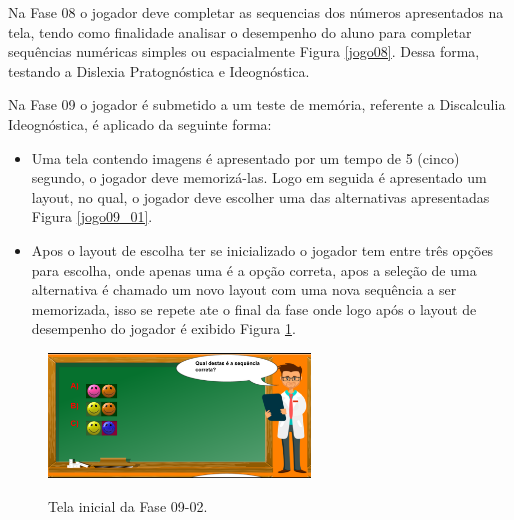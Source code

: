 \documentclass[
	12pt,				%
    oneside,			%
	a4paper,			%
	english,			%
	french,				%
	spanish,			%
	brazil,				%
	]{abntex2}
\begin{document}
Na Fase  08 o jogador deve completar as sequencias dos números apresentados na tela, tendo como finalidade analisar o desempenho do aluno para completar sequências numéricas simples ou espacialmente Figura \ref{jogo08}. Dessa forma, testando a Dislexia Pratognóstica e Ideognóstica. 




Na Fase 09 o jogador é submetido a um teste de memória, referente a Discalculia Ideognóstica, é aplicado da seguinte forma:
\begin{itemize}
\item Uma tela contendo imagens é apresentado por um tempo de 5 (cinco) segundo, o jogador deve memorizá-las. Logo em seguida é apresentado um layout, no qual, o jogador deve escolher uma das alternativas apresentadas Figura \ref{jogo09_01}.

\item Apos o layout de escolha ter se inicializado o jogador tem entre três opções para escolha, onde apenas uma é a opção correta, apos a seleção de uma alternativa é chamado um novo layout com uma nova sequência a ser memorizada, isso se repete ate o final da fase onde logo após o layout de desempenho do jogador é exibido Figura \ref{jogo09_02}.
\end{itemize}

\begin{figure} [h] 


\caption{Tela inicial da Fase 09-02.}

\includegraphics[width=0.62\textwidth]{jogo09_02.png} %
\centering
\\
\label{jogo09_02}
\end{figure}
\end{document}
